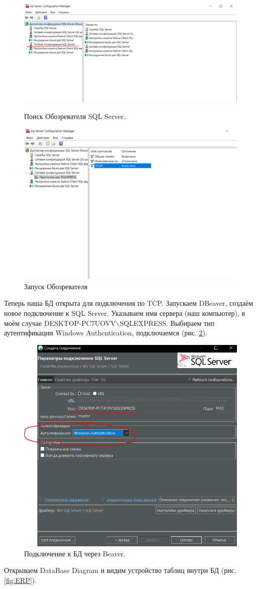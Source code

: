 \begin{figure}[h!]
    \begin{minipage}[p]{0.45\linewidth}
        \centering
        \includegraphics[width=1\linewidth]{Pic/lab2/ConfigNet.PNG}
        \caption{Поиск Обозревателя SQL Server.}
        \label{fig:ConfigNet}
    \end{minipage}
    \hfill
    \begin{minipage}[p]{0.45\linewidth}
        \centering
        \includegraphics[width=0.68\linewidth]{Pic/lab2/Protocols.PNG}
        \caption{Запуск Обозревателя}
        \label{fig:Protocols}
    \end{minipage}
    
\end{figure}

Теперь наша БД открыта для подключения по TCP. Запускаем DBeaver, создаём новое подключение к SQL Server. Указываем имя сервера (наш компьютер), в моём случае DESKTOP-PC7UOVV$\backslash$SQLEXPRESS. Выбираем тип аутентификации Windows Authentication, подключаемся (рис. \ref{fig:ConnectBeaver}).
\begin{figure}[h!]
    \centering
    \includegraphics[width=0.5\linewidth]{Pic/lab2/ConnectBeaver.PNG}
    \caption{Подключение к БД через Beaver.}
    \label{fig:ConnectBeaver}
\end{figure}
\newpage
Открываем DataBase Diagram и видим устройство таблиц внутри БД (рис. \ref{fig:ERP}).

